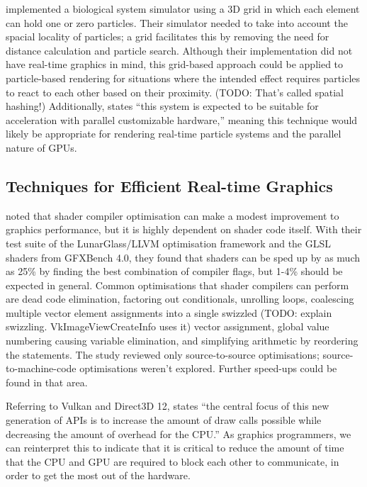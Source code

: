 \documentclass[11pt, a4paper, twocolumn]{article}
\begin{document}
\citet{Boulianne2007} implemented a biological system simulator using a 3D grid in which each element can hold one or zero particles. Their simulator needed to take into account the spacial locality of particles; a grid facilitates this by removing the need for distance calculation and particle search. Although their implementation did not have real-time graphics in mind, this grid-based approach could be applied to particle-based rendering for situations where the intended effect requires particles to react to each other based on their proximity. (TODO: That's called spatial hashing!) Additionally, \citet{Boulianne2007} states ``this system is expected to be suitable for acceleration with parallel customizable hardware,'' meaning this technique would likely be appropriate for rendering real-time particle systems and the parallel nature of GPUs.

\subsection{Techniques for Efficient Real-time Graphics}

\citet{Crawford2018} noted that shader compiler optimisation can make a modest improvement to graphics performance, but it is highly dependent on shader code itself. With their test suite of the LunarGlass/LLVM optimisation framework and the GLSL shaders from GFXBench 4.0, they found that shaders can be sped up by as much as 25\% by finding the best combination of compiler flags, but 1-4\% should be expected in general. Common optimisations that shader compilers can perform are dead code elimination, factoring out conditionals, unrolling loops, coalescing multiple vector element assignments into a single swizzled (TODO: explain swizzling. VkImageViewCreateInfo uses it) vector assignment, global value numbering causing variable elimination, and simplifying arithmetic by reordering the statements. The study reviewed only source-to-source optimisations; source-to-machine-code optimisations weren't explored. Further speed-ups could be found in that area.

Referring to Vulkan and Direct3D 12, \citet{Joseph2016} states ``the central focus of this new generation of APIs is to increase the amount of draw calls possible while decreasing the amount of overhead for the CPU.'' As graphics programmers, we can reinterpret this to indicate that it is critical to reduce the amount of time that the CPU and GPU are required to block each other to communicate, in order to get the most out of the hardware.
\end{document}

